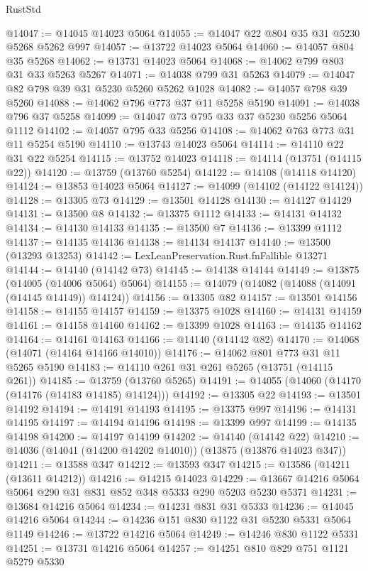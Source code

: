\begin{lexlean}{RustStd}
\begin{coremodule}
@14047 := @14045 @14023 @5064
@14055 := @14047 @22 @804 @35 @31 @5230 @5268 @5262 @997
@14057 := @13722 @14023 @5064
@14060 := @14057 @804 @35 @5268
@14062 := @13731 @14023 @5064
@14068 := @14062 @799 @803 @31 @33 @5263 @5267
@14071 := @14038 @799 @31 @5263
@14079 := @14047 @82 @798 @39 @31 @5230 @5260 @5262 @1028
@14082 := @14057 @798 @39 @5260
@14088 := @14062 @796 @773 @37 @11 @5258 @5190
@14091 := @14038 @796 @37 @5258
@14099 := @14047 @73 @795 @33 @37 @5230 @5256 @5064 @1112
@14102 := @14057 @795 @33 @5256
@14108 := @14062 @763 @773 @31 @11 @5254 @5190
@14110 := @13743 @14023 @5064
@14114 := @14110 @22 @31 @22 @5254
@14115 := @13752 @14023
@14118 := @14114 (@13751 (@14115 @22))
@14120 := @13759 (@13760 @5254)
@14122 := @14108 (@14118 @14120)
@14124 := @13853 @14023 @5064
@14127 := @14099 (@14102 (@14122 @14124))
@14128 := @13305 @73
@14129 := @13501 @14128
@14130 := @14127 @14129
@14131 := @13500 @8
@14132 := @13375 @1112
@14133 := @14131 @14132
@14134 := @14130 @14133
@14135 := @13500 @7
@14136 := @13399 @1112
@14137 := @14135 @14136
@14138 := @14134 @14137
@14140 := @13500 (@13293 @13253)
@14142 := LexLeanPreservation.Rust.fnFallible @13271
@14144 := @14140 (@14142 @73)
@14145 := @14138 @14144
@14149 := @13875 (@14005 (@14006 @5064) @5064)
@14155 := @14079 (@14082 (@14088 (@14091 (@14145 @14149)) @14124))
@14156 := @13305 @82
@14157 := @13501 @14156
@14158 := @14155 @14157
@14159 := @13375 @1028
@14160 := @14131 @14159
@14161 := @14158 @14160
@14162 := @13399 @1028
@14163 := @14135 @14162
@14164 := @14161 @14163
@14166 := @14140 (@14142 @82)
@14170 := @14068 (@14071 (@14164 @14166 @14010))
@14176 := @14062 @801 @773 @31 @11 @5265 @5190
@14183 := @14110 @261 @31 @261 @5265 (@13751 (@14115 @261))
@14185 := @13759 (@13760 @5265)
@14191 := @14055 (@14060 (@14170 (@14176 (@14183 @14185) @14124)))
@14192 := @13305 @22
@14193 := @13501 @14192
@14194 := @14191 @14193
@14195 := @13375 @997
@14196 := @14131 @14195
@14197 := @14194 @14196
@14198 := @13399 @997
@14199 := @14135 @14198
@14200 := @14197 @14199
@14202 := @14140 (@14142 @22)
@14210 := @14036 (@14041 (@14200 @14202 @14010)) (@13875 (@13876 @14023 @347))
@14211 := @13588 @347
@14212 := @13593 @347
@14215 := @13586 (@14211 (@13611 @14212))
@14216 := @14215 @14023
@14229 := @13667 @14216 @5064 @5064 @290 @31 @831 @852 @348 @5333 @290 @5203 @5230 @5371
@14231 := @13684 @14216 @5064
@14234 := @14231 @831 @31 @5333
@14236 := @14045 @14216 @5064
@14244 := @14236 @151 @830 @1122 @31 @5230 @5331 @5064 @1149
@14246 := @13722 @14216 @5064
@14249 := @14246 @830 @1122 @5331
@14251 := @13731 @14216 @5064
@14257 := @14251 @810 @829 @751 @1121 @5279 @5330

\end{coremodule}
\end{lexlean}
